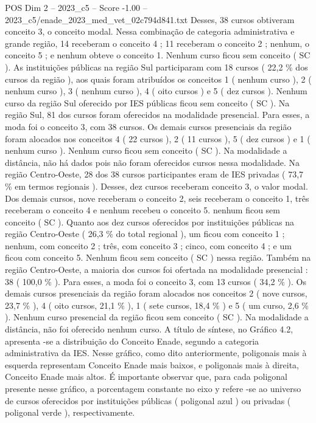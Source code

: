 \begin{textsample}{POS Dim 2 – 2023\_c5 – Score -1.00 – 2023\_c5/enade\_2023\_med\_vet\_02c794d841.txt}
Desses, 38 cursos obtiveram conceito 3, o conceito modal.
Nessa combinação de categoria administrativa e grande região, 14 receberam o conceito 4 ; 11 receberam o conceito 2 ; nenhum, o conceito 5 ; e nenhum obteve o conceito 1.
Nenhum curso ficou sem conceito ( SC ).
As instituições públicas na região Sul participaram com 18 cursos ( 22,2 \% dos cursos da região ), aos quais foram atribuídos os conceitos 1 ( nenhum curso ), 2 ( nenhum curso ), 3 ( nenhum curso ), 4 ( oito cursos ) e 5 ( dez cursos ).
Nenhum curso da região Sul oferecido por IES públicas ficou sem conceito ( SC ).
Na região Sul, 81 dos cursos foram oferecidos na modalidade presencial.
Para esses, a moda foi o conceito 3, com 38 cursos.
Os demais cursos presenciais da região foram alocados nos conceitos 4 ( 22 cursos ), 2 ( 11 cursos ), 5 ( dez cursos ) e 1 ( nenhum curso ).
Nenhum curso ficou sem conceito ( SC ).
Na modalidade a distância, não há dados pois não foram oferecidos cursos nessa modalidade.
Na região Centro-Oeste, 28 dos 38 cursos participantes eram de IES privadas ( 73,7 \% em termos regionais ).
Desses, dez cursos receberam conceito 3, o valor modal.
Dos demais cursos, nove receberam o conceito 2, seis receberam o conceito 1, três receberam o conceito 4 e nenhum recebeu o conceito 5. nenhum ficou sem conceito ( SC ).
Quanto aos dez cursos oferecidos por instituições públicas na região Centro-Oeste ( 26,3 \% do total regional ), um ficou com conceito 1 ; nenhum, com conceito 2 ; três, com conceito 3 ; cinco, com conceito 4 ; e um ficou com conceito 5.
Nenhum ficou sem conceito ( SC ) nessa região.
Também na região Centro-Oeste, a maioria dos cursos foi ofertada na modalidade presencial : 38 ( 100,0 \% ).
Para esses, a moda foi o conceito 3, com 13 cursos ( 34,2 \% ).
Os demais cursos presenciais da região foram alocados nos conceitos 2 ( nove cursos, 23,7 \% ), 4 ( oito cursos, 21,1 \% ), 1 ( sete cursos, 18,4 \% ) e 5 ( um curso, 2,6 \% ).
Nenhum curso presencial da região ficou sem conceito ( SC ).
Na modalidade a distância, não foi oferecido nenhum curso.
A título de síntese, no Gráfico 4.2, apresenta -se a distribuição do Conceito Enade, segundo a categoria administrativa da IES.
Nesse gráfico, como dito anteriormente, poligonais mais à esquerda representam Conceito Enade mais baixos, e poligonais mais à direita, Conceito Enade mais altos.
É importante observar que, para cada poligonal presente nesse gráfico, a porcentagem constante no eixo y refere -se ao universo de cursos oferecidos por instituições públicas ( poligonal azul ) ou privadas ( poligonal verde ), respectivamente.

\end{textsample}

